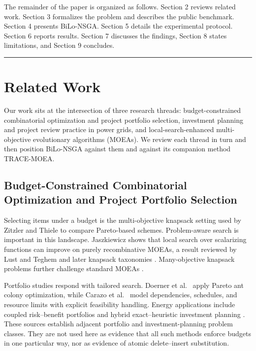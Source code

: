 \documentclass[applsci,article,submit,moreauthors]{Definitions/mdpi}
\begin{document}
The remainder of the paper is organized as follows. Section 2 reviews related work. Section 3 formalizes the problem and describes the public benchmark. Section 4 presents BiLo-NSGA. Section 5 details the experimental protocol. Section 6 reports results. Section 7 discusses the findings, Section 8 states limitations, and Section 9 concludes.

\begin{center}\rule{0.5\linewidth}{0.5pt}\end{center}

\section{Related Work}\label{related-work}

Our work sits at the intersection of three research threads: budget-constrained combinatorial optimization and project portfolio selection, investment planning and project review practice in power grids, and local-search-enhanced multi-objective evolutionary algorithms (MOEAs). We review each thread in turn and then position BiLo-NSGA against them and against its companion method TRACE-MOEA.

\subsection{Budget-Constrained Combinatorial Optimization and Project Portfolio Selection}\label{budget-constrained-combinatorial-optimization-and-project-portfolio-selection}

Selecting items under a budget is the multi-objective knapsack setting used by Zitzler and Thiele \cite{ref1} to compare Pareto-based schemes. Problem-aware search is important in this landscape. Jaszkiewicz \cite{ref2} shows that local search over scalarizing functions can improve on purely recombinative MOEAs, a result reviewed by Lust and Teghem \cite{ref3} and later knapsack taxonomies \cite{ref4}. Many-objective knapsack problems further challenge standard MOEAs \cite{ref5}.

Portfolio studies respond with tailored search. Doerner et al.~\cite{ref6} apply Pareto ant colony optimization, while Carazo et al.~\cite{ref7} model dependencies, schedules, and resource limits with explicit feasibility handling. Energy applications include coupled risk--benefit portfolios \cite{ref8} and hybrid exact--heuristic investment planning \cite{ref9}. These sources establish adjacent portfolio and investment-planning problem classes. They are not used here as evidence that all such methods enforce budgets in one particular way, nor as evidence of atomic delete--insert substitution.
\end{document}
